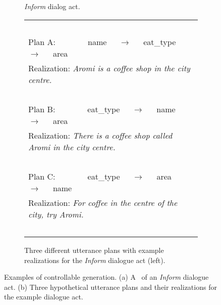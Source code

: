 \begin{figure}

    \begin{subfigure}[t]{.30\textwidth}
            \centering


    ~\\~\\~\\~\\

    \caption{\textit{Inform} dialog act.}
\end{subfigure}
\hfill
\begin{subfigure}[t]{.65\textwidth}
    \small
    \centering
        \begin{tabular}{l}
            ~\\
            Plan A:~~~~~~~~name~~~$\rightarrow$~~~eat\_type~~~$\rightarrow$~~~area\\[4pt]
            Realization: \textit{Aromi is a coffee shop in the city 
                centre.}\\
                ~\\
                Plan B:~~~~~~~~eat\_type~~~$\rightarrow$~~~name~~~$\rightarrow$~~~area\\[4pt]
            Realization: \textit{There is a coffee shop called Aromi in the 
                city centre.}\\
                ~\\
                Plan C:~~~~~~~~eat\_type~~~$\rightarrow$~~~area~~~$\rightarrow$~~~name\\[4pt]
            Realization: \textit{For coffee in the centre of the city, try 
                Aromi.}\\
                ~\\
        \end{tabular}
        \caption{Three different utterance plans with example realizations
        for the \textit{Inform} dialogue act (left).}
\end{subfigure}
\caption{Examples of controllable generation. (a) A \meaningrepresentation~of an \textit{Inform} dialogue act. (b) Three hypothetical utterance plans and their realizations for the example dialogue act.}
\label{fig:examplecontrol}
\end{figure}

